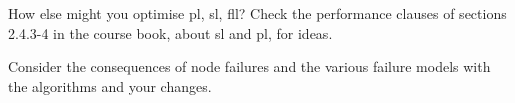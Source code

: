 \documentclass[a4paper]{article}
\begin{document}
How else might you optimise pl, sl, fll? Check the performance clauses of
sections 2.4.3-4 in the course book, about sl and pl, for ideas.

Consider the consequences of node failures and the various failure models
with the algorithms and your changes.










\end{document}
